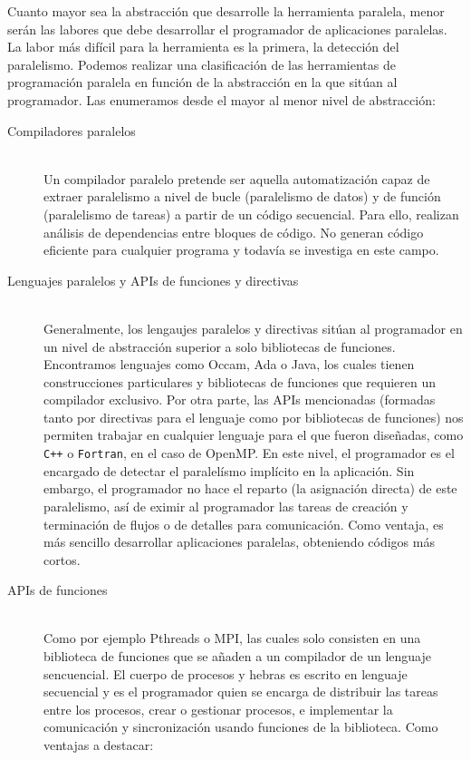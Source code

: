 Cuanto mayor sea la abstracción que desarrolle la herramienta paralela, menor serán las labores que debe desarrollar el programador de aplicaciones paralelas. La labor más difícil para la herramienta es la primera, la detección del paralelismo. Podemos realizar una clasificación de las herramientas de programación paralela en función de la abstracción en la que sitúan al programador. Las enumeramos desde el mayor al menor nivel de abstracción:
\begin{description}
    \item [Compiladores paralelos]~\\
        Un compilador paralelo pretende ser aquella automatización capaz de extraer paralelismo a nivel de bucle (paralelismo de datos) y de función (paralelismo de tareas) a partir de un código secuencial. Para ello, realizan análisis de dependencias entre bloques de código. No generan código eficiente para cualquier programa y todavía se investiga en este campo.
    \item [Lenguajes paralelos y APIs de funciones y directivas]~\\
        Generalmente, los lengaujes paralelos y directivas sitúan al programador en un nivel de abstracción superior a solo bibliotecas de funciones. Encontramos lenguajes como Occam, Ada o Java, los cuales tienen construcciones particulares y bibliotecas de funciones que requieren un compilador exclusivo. Por otra parte, las APIs mencionadas (formadas tanto por directivas para el lenguaje como por bibliotecas de funciones) nos permiten trabajar en cualquier lenguaje para el que fueron diseñadas, como \verb|C++| o \verb|Fortran|, en el caso de OpenMP\@. En este nivel, el programador es el encargado de detectar el paralelísmo implícito en la aplicación. Sin embargo, el programador no hace el reparto (la asignación directa) de este paralelismo, así de eximir al programador las tareas de creación y terminación de flujos o de detalles para comunicación. Como ventaja, es más sencillo desarrollar aplicaciones paralelas, obteniendo códigos más cortos.
    \item [APIs de funciones]~\\
        Como por ejemplo Pthreads o MPI, las cuales solo consisten en una biblioteca de funciones que se añaden a un compilador de un lenguaje sencuencial. El cuerpo de procesos y hebras es escrito en lenguaje secuencial y es el programador quien se encarga de distribuir las tareas entre los procesos, crear o gestionar procesos, e implementar la comunicación y sincronización usando funciones de la biblioteca. Como ventajas a destacar:

\end{description}
